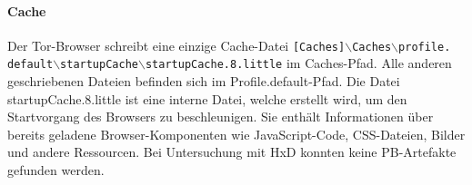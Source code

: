 \begin{appendices}
\paragraph*{Cache}
Der Tor-Browser schreibt eine einzige Cache-Datei \texttt{[Caches]$\backslash$Caches$\backslash$profile.\\default$\backslash$startupCache$\backslash$startupCache.8.little} im Caches-Pfad. Alle anderen geschriebenen Dateien befinden sich im Profile.default-Pfad.
Die Datei \glqq{}startupCache.8.little\grqq{} ist eine interne Datei, welche erstellt wird, um den Startvorgang des Browsers zu beschleunigen. Sie enthält Informationen über bereits geladene Browser-Komponenten wie JavaScript-Code, CSS-Dateien, Bilder und andere Ressourcen. \cite{MozillaWiki.05.06.2023} 
Bei Untersuchung mit HxD konnten keine PB-Artefakte gefunden werden.


\end{appendices}
